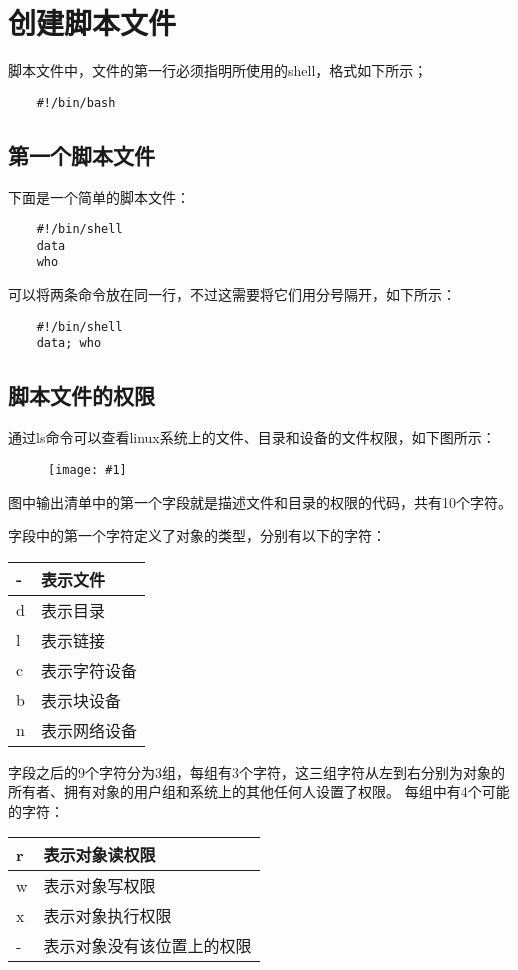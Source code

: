 \documentclass[a4paper,left=1.5cm,right=1.5cm,11pt]{article}
\newcommand{\fic}[1]{\begin{figure}[H]
		\center
		\texttt{[image: \#1]}
	\end{figure}}
\begin{document}
\tableofcontents

\clearpage

\section{创建脚本文件}
	脚本文件中，文件的第一行必须指明所使用的shell，格式如下所示；
	\begin{lstlisting}
	#!/bin/bash
	\end{lstlisting}

\subsection{第一个脚本文件}
	下面是一个简单的脚本文件：
	\begin{lstlisting}
	#!/bin/shell
	data
	who
	\end{lstlisting}

	可以将两条命令放在同一行，不过这需要将它们用分号隔开，如下所示：
	\begin{lstlisting}
	#!/bin/shell
	data; who
	\end{lstlisting}

\subsection{脚本文件的权限}
	通过ls命令可以查看linux系统上的文件、目录和设备的文件权限，如下图所示：
	\fic{1.png}

	图中输出清单中的第一个字段就是描述文件和目录的权限的代码，共有10个字符。\par
	字段中的第一个字符定义了对象的类型，分别有以下的字符：
	\begin{longtable}{p{2cm}p{4cm}}
	\hline
	- & 表示文件 \\
	\hline
	d & 表示目录 \\
	\hline
	l & 表示链接 \\
	\hline
	c & 表示字符设备 \\
	\hline
	b & 表示块设备 \\
	\hline
	n & 表示网络设备 \\
	\hline
	\end{longtable}

	字段之后的9个字符分为3组，每组有3个字符，这三组字符从左到右分别为对象的所有者、拥有对象的用户组和系统上的其他任何人设置了权限。
	每组中有4个可能的字符：
	\begin{longtable}{p{2cm}p{4cm}}
	\hline
	r & 表示对象读权限 \\
	\hline
	w & 表示对象写权限 \\
	\hline
	x & 表示对象执行权限 \\
	\hline
	- & 表示对象没有该位置上的权限 \\
	\hline
	\end{longtable}
\end{document}
